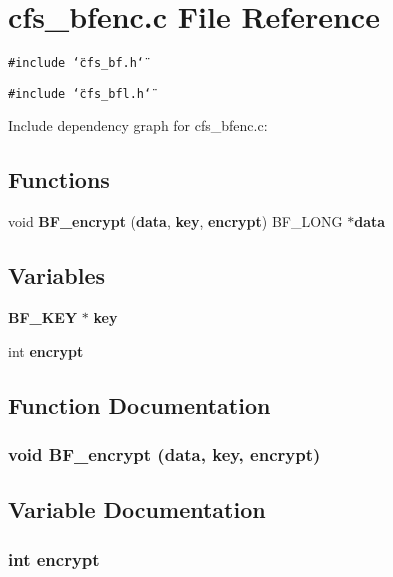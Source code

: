 \section{cfs\_\-bfenc.c File Reference}
\label{cfs__bfenc_8c}


{\tt \#include \char`\"{}cfs\_\-bf.h\char`\"{}}\par
{\tt \#include \char`\"{}cfs\_\-bfl.h\char`\"{}}\par


Include dependency graph for cfs\_\-bfenc.c:\subsection*{Functions}
\begin{CompactItemize}
\item 
void {\bf BF\_\-encrypt} ({\bf data}, {\bf key}, {\bf encrypt}) BF\_\-LONG $\ast${\bf data}
\end{CompactItemize}
\subsection*{Variables}
\begin{CompactItemize}
\item 
{\bf BF\_\-KEY} $\ast$ {\bf key}
\item 
int {\bf encrypt}
\end{CompactItemize}


\subsection{Function Documentation}
\subsubsection{\setlength{\rightskip}{0pt plus 5cm}void BF\_\-encrypt ({\bf data}, {\bf key}, {\bf encrypt})}\label{cfs__bfenc_8c_a2}




\subsection{Variable Documentation}
\subsubsection{\setlength{\rightskip}{0pt plus 5cm}int {\bf encrypt}}\label{cfs__bfenc_8c_a1}




